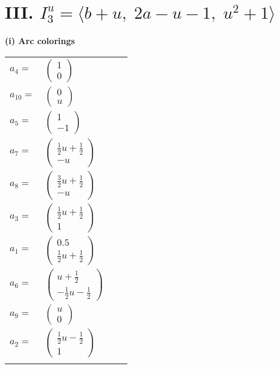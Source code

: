 \documentclass[1p]{elsarticle_modified}
\theoremstyle{definition}
\begin{document}
\centering \section*{III. $I^u_{3}= \langle b+u,\;2 a- u-1,\;u^2+1 \rangle$}
\flushleft \textbf{(i) Arc colorings}\\
\begin{tabular}{m{7pt} m{180pt} m{7pt} m{180pt} }
\flushright $a_{4}=$&$\begin{pmatrix}1\\0\end{pmatrix}$ \\
\flushright $a_{10}=$&$\begin{pmatrix}0\\u\end{pmatrix}$ \\
\flushright $a_{5}=$&$\begin{pmatrix}1\\-1\end{pmatrix}$ \\
\flushright $a_{7}=$&$\begin{pmatrix}\frac{1}{2} u+\frac{1}{2}\\- u\end{pmatrix}$ \\
\flushright $a_{8}=$&$\begin{pmatrix}\frac{3}{2} u+\frac{1}{2}\\- u\end{pmatrix}$ \\
\flushright $a_{3}=$&$\begin{pmatrix}\frac{1}{2} u+\frac{1}{2}\\1\end{pmatrix}$ \\
\flushright $a_{1}=$&$\begin{pmatrix}0.5\\\frac{1}{2} u+\frac{1}{2}\end{pmatrix}$ \\
\flushright $a_{6}=$&$\begin{pmatrix}u+\frac{1}{2}\\-\frac{1}{2} u-\frac{1}{2}\end{pmatrix}$ \\
\flushright $a_{9}=$&$\begin{pmatrix}u\\0\end{pmatrix}$ \\
\flushright $a_{2}=$&$\begin{pmatrix}\frac{1}{2} u-\frac{1}{2}\\1\end{pmatrix}$\\&\end{tabular}
\end{document}
